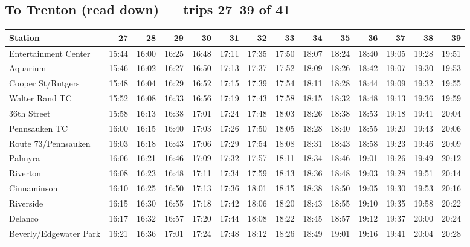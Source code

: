 \subsection*{To Trenton (read down) --- trips 27--39 of 41}
\begin{center}\footnotesize\setlength{\tabcolsep}{3pt}\begin{tabular}{@{}lrrrrrrrrrrrrr@{}}\toprule
Station & 27 & 28 & 29 & 30 & 31 & 32 & 33 & 34 & 35 & 36 & 37 & 38 & 39 \\\midrule
Entertainment Center & 15:44 & 16:00 & 16:25 & 16:48 & 17:11 & 17:35 & 17:50 & 18:07 & 18:24 & 18:40 & 19:05 & 19:28 & 19:51 \\
Aquarium & 15:46 & 16:02 & 16:27 & 16:50 & 17:13 & 17:37 & 17:52 & 18:09 & 18:26 & 18:42 & 19:07 & 19:30 & 19:53 \\
Cooper St/Rutgers & 15:48 & 16:04 & 16:29 & 16:52 & 17:15 & 17:39 & 17:54 & 18:11 & 18:28 & 18:44 & 19:09 & 19:32 & 19:55 \\
Walter Rand TC & 15:52 & 16:08 & 16:33 & 16:56 & 17:19 & 17:43 & 17:58 & 18:15 & 18:32 & 18:48 & 19:13 & 19:36 & 19:59 \\
36th Street & 15:58 & 16:13 & 16:38 & 17:01 & 17:24 & 17:48 & 18:03 & 18:26 & 18:38 & 18:53 & 19:18 & 19:41 & 20:04 \\
Pennsauken TC & 16:00 & 16:15 & 16:40 & 17:03 & 17:26 & 17:50 & 18:05 & 18:28 & 18:40 & 18:55 & 19:20 & 19:43 & 20:06 \\
Route 73/Pennsauken & 16:03 & 16:18 & 16:43 & 17:06 & 17:29 & 17:54 & 18:08 & 18:31 & 18:43 & 18:58 & 19:23 & 19:46 & 20:09 \\
Palmyra & 16:06 & 16:21 & 16:46 & 17:09 & 17:32 & 17:57 & 18:11 & 18:34 & 18:46 & 19:01 & 19:26 & 19:49 & 20:12 \\
Riverton & 16:08 & 16:23 & 16:48 & 17:11 & 17:34 & 17:59 & 18:13 & 18:36 & 18:48 & 19:03 & 19:28 & 19:51 & 20:14 \\
Cinnaminson & 16:10 & 16:25 & 16:50 & 17:13 & 17:36 & 18:01 & 18:15 & 18:38 & 18:50 & 19:05 & 19:30 & 19:53 & 20:16 \\
Riverside & 16:15 & 16:30 & 16:55 & 17:18 & 17:42 & 18:06 & 18:20 & 18:43 & 18:55 & 19:10 & 19:35 & 19:58 & 20:22 \\
Delanco & 16:17 & 16:32 & 16:57 & 17:20 & 17:44 & 18:08 & 18:22 & 18:45 & 18:57 & 19:12 & 19:37 & 20:00 & 20:24 \\
Beverly/Edgewater Park & 16:21 & 16:36 & 17:01 & 17:24 & 17:48 & 18:12 & 18:26 & 18:49 & 19:01 & 19:16 & 19:41 & 20:04 & 20:28 \\

\end{tabular}
\end{center}
